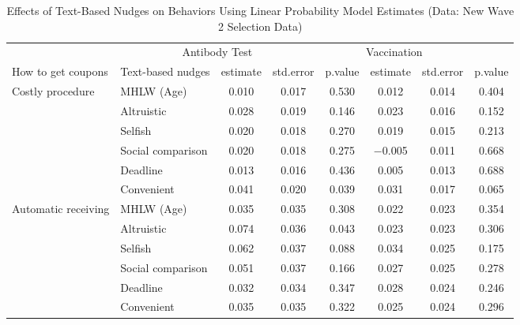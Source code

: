 \begin{table}

\caption{Effects of Text-Based Nudges on Behaviors Using Linear Probability Model Estimates (Data: New Wave 2 Selection Data) \label{tab:act2-reg-ftest}}
\centering
\begin{tabular}[t]{>{\raggedright\arraybackslash}p{5em}lcccccc}
\toprule
\multicolumn{2}{c}{ } & \multicolumn{3}{c}{Antibody Test} & \multicolumn{3}{c}{Vaccination} \\
\cmidrule(l{3pt}r{3pt}){3-5} \cmidrule(l{3pt}r{3pt}){6-8}
How to get coupons & Text-based nudges & estimate & std.error & p.value & estimate  & std.error  & p.value \\
\midrule
Costly procedure & MHLW (Age) & \num{0.010} & \num{0.017} & \num{0.530} & \num{0.012} & \num{0.014} & \num{0.404}\\
 & Altruistic & \num{0.028} & \num{0.019} & \num{0.146} & \num{0.023} & \num{0.016} & \num{0.152}\\
 & Selfish & \num{0.020} & \num{0.018} & \num{0.270} & \num{0.019} & \num{0.015} & \num{0.213}\\
 & Social comparison & \num{0.020} & \num{0.018} & \num{0.275} & \num{-0.005} & \num{0.011} & \num{0.668}\\
 & Deadline & \num{0.013} & \num{0.016} & \num{0.436} & \num{0.005} & \num{0.013} & \num{0.688}\\
 & Convenient & \num{0.041} & \num{0.020} & \num{0.039} & \num{0.031} & \num{0.017} & \num{0.065}\\
Automatic receiving & MHLW (Age) & \num{0.035} & \num{0.035} & \num{0.308} & \num{0.022} & \num{0.023} & \num{0.354}\\
 & Altruistic & \num{0.074} & \num{0.036} & \num{0.043} & \num{0.023} & \num{0.023} & \num{0.306}\\
 & Selfish & \num{0.062} & \num{0.037} & \num{0.088} & \num{0.034} & \num{0.025} & \num{0.175}\\
 & Social comparison & \num{0.051} & \num{0.037} & \num{0.166} & \num{0.027} & \num{0.025} & \num{0.278}\\
 & Deadline & \num{0.032} & \num{0.034} & \num{0.347} & \num{0.028} & \num{0.024} & \num{0.246}\\
 & Convenient & \num{0.035} & \num{0.035} & \num{0.322} & \num{0.025} & \num{0.024} & \num{0.296}\\
\bottomrule
\end{tabular}
\end{table}
